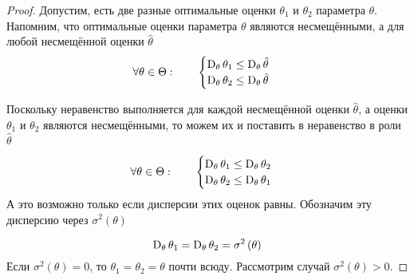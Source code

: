 \begin{proof}
  Допустим,
  есть две разные оптимальные оценки $\theta_1$ и $\theta_2$ параметра
  $\theta$.
  Напомним, что оптимальные оценки параметра $\theta$ являются несмещёнными,
  а для любой несмещённой оценки $\hat{\theta}$
  \begin{align*}
    \forall\theta\in\Theta:\qquad
    \begin{cases}
      \operatorname{D}_{\theta} \theta_1
        \le\operatorname{D}_{\theta} \hat{\theta}\\
      \operatorname{D}_{\theta} \theta_2
        \le\operatorname{D}_{\theta} \hat{\theta}
    \end{cases}
  \end{align*}

  Поскольку неравенство выполняется
  для каждой несмещённой оценки $\hat{\theta}$,
  а оценки $\theta_1$ и $\theta_2$ являются несмещёнными,
  то можем их и поставить в неравенство в роли $\hat{\theta}$

  \begin{align*}
    \forall\theta\in\Theta:\qquad
    \begin{cases}
      \operatorname{D}_{\theta} \theta_1
        \le\operatorname{D}_{\theta} \theta_2\\
      \operatorname{D}_{\theta} \theta_2
        \le\operatorname{D}_{\theta} \theta_1
    \end{cases}
  \end{align*}
  А это возможно только если дисперсии этих оценок равны.
  Обозначим эту дисперсию через $\sigma^2\left( \theta \right)$

  $$\operatorname{D}_{\theta} \theta_1
    = \operatorname{D}_{\theta} \theta_2
    = \sigma^2\left( \theta \right)$$
  Если $\sigma^2\left( \theta \right) = 0$, то $\theta_1 = \theta_2 = \theta$
  почти всюду. Рассмотрим случай $\sigma^2\left(\theta\right)>0$.


\end{proof}
